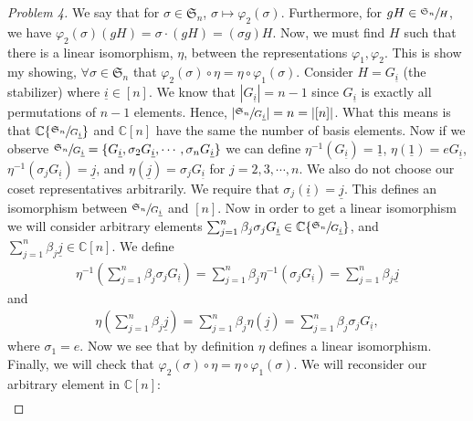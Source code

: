 \documentclass[titlepage]{article}
\theoremstyle{plain}
\theoremstyle{definition}
\theoremstyle{remark}
\theoremstyle{exercise-style}
\numberwithin{equation}{section}
\numberwithin{theorem}{section}
\numberwithin{remark}{section}
\begin{document}
\begin{proof}[Problem 4]
    We say that for $\sigma \in \mathfrak{S}_n$, $\sigma \mapsto \varphi_2(\sigma)$. Furthermore, for $gH \in \sfrac{\mathfrak{S}_n}{H}$, we have $\varphi_2(\sigma)(gH) = \sigma \cdot (gH) = (\sigma g)H$. Now, we must find $H$ such that there is a linear isomorphism, $\eta$, between the representations $\varphi_1, \varphi_2$. This is show my showing, $\forall \sigma \in \mathfrak{S}_n$ that $\varphi_2(\sigma) \circ \eta = \eta \circ \varphi_1(\sigma)$. Consider $H = G_{\underline{i}}$ (the stabilizer) where $\underline{i} \in [n]$. We know that $|G_{\underline{i}}| = n-1$ since $G_{\underline{i}}$ is exactly all permutations of $n-1$ elements. Hence, $|\sfrac{\mathfrak{S}_n}{G_{\underline{i}}}| = n = |[n]|$. What this means is that $\mathbb{C}\{\sfrac{\mathfrak{S}_n}{G_{\underline{i}}} \}$ and $\mathbb{C}[n]$ have the same the number of basis elements. Now if we observe $\sfrac{\mathfrak{S}_n}{G_{\underline{i}}} = \{ G_{\underline{i}}, \sigma_2 G_{\underline{i}} , \cdots , \sigma_n G_{\underline{i}} \}$ we can define $\eta^{-1}(G_{\underline{i}}) = \underline{1}$, $\eta(\underline{1}) = eG_{\underline{i}}$, $\eta^{-1}(\sigma_jG_{\underline{i}}) = \underline{j}$, and $\eta(\underline{j})=\sigma_j G_{\underline{i}}$ for $j =2,3,\cdots, n$. We also do not choose our coset representatives arbitrarily. We require that $\sigma_j(\underline{i}) = \underline{j}$. This defines an isomorphism between $\sfrac{\mathfrak{S}_n}{G_{\underline{i}}}$ and $[n]$. Now in order to get a linear isomorphism we will consider arbitrary elements $\sum_{j =1}^n \beta_j\sigma_j G_{\underline{i}} \in \mathbb{C}\{\sfrac{\mathfrak{S}_n}{G_{\underline{i}}}\}$, and $\sum_{j =1}^n \beta_j\underline{j} \in \mathbb{C}[n]$. We define
    \begin{align}
        \eta^{-1} \left ( \sum_{j =1}^n \beta_j\sigma_j G_{\underline{i}} \right ) = \sum_{j =1}^n \beta_j\eta^{-1}(\sigma_j G_{\underline{i}}) = \sum_{j =1}^n \beta_j \underline{j}
    \end{align}
    and
    \begin{align}
        \eta\left( \sum_{j =1}^n \beta_j \underline{j} \right) = \sum_{j =1}^n \beta_j \eta (\underline{j}) = \sum_{j =1}^n \beta_j\sigma_j G_{\underline{i}},
    \end{align}
    where $\sigma_1=e$. Now we see that by definition $\eta$ defines a linear isomorphism. Finally, we will check that $\varphi_2(\sigma) \circ \eta = \eta \circ \varphi_1(\sigma)$. We will reconsider our arbitrary element in $\mathbb{C}[n]$:
    \begin{align}

\end{align}
\end{proof}
\end{document}
